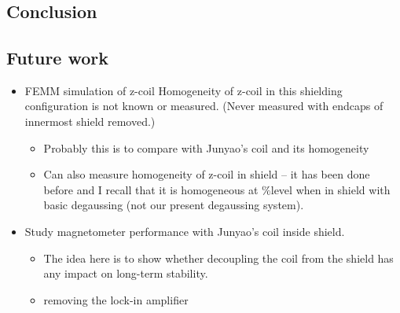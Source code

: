 \documentclass[12pt]{report}
\begin{document}
\chapter{}
\section{Conclusion}
\section{Future work}
\begin{itemize}
\item	FEMM simulation of z-coil 	Homogeneity of z-coil in this shielding configuration is not known or measured.  (Never measured with endcaps of innermost shield removed.)
\begin{itemize}
\item Probably this is to compare with Junyao’s coil and its homogeneity

\item
Can also measure homogeneity of z-coil in shield – it has been done before and I recall that it is homogeneous at $\% $level when in shield with basic degaussing (not our present degaussing system).
\end{itemize}
\item
Study magnetometer performance with Junyao's coil inside shield. 
\begin{itemize}
\item	The idea here is to show whether decoupling the coil from the shield has any impact on long-term stability.
 \item removing the lock-in amplifier
\end{itemize}
\end{itemize}
\newpage
\printbibliography
\end{document}
